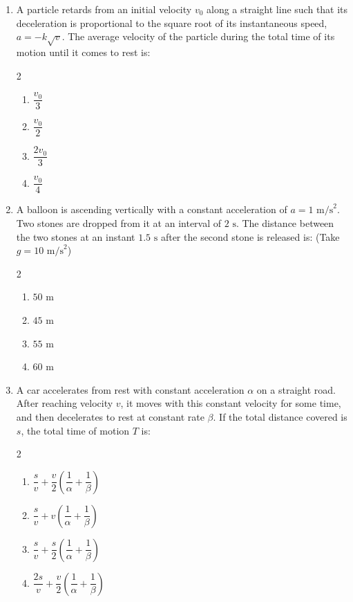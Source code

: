 \documentclass[11pt,a4paper]{article}
\begin{document}
\begin{enumerate}[label=\textbf{\textcolor{l3Crimson}{Q\arabic*.}},leftmargin=24pt,itemsep=10pt,start=51]
  \item A particle retards from an initial velocity $v_0$ along a straight line such that its deceleration is proportional to the square root of its instantaneous speed, $a = -k \sqrt{v}$. The average velocity of the particle during the total time of its motion until it comes to rest is:
  \begin{multicols}{2}
  \begin{enumerate}[label=\textbf{\textcolor{primaryDark}{(\Alph*)}},itemsep=2pt]
    \item $\dfrac{v_0}{3}$
    \item $\dfrac{v_0}{2}$
    \item $\dfrac{2v_0}{3}$
    \item $\dfrac{v_0}{4}$
  \end{enumerate}
  \end{multicols}

  \item A balloon is ascending vertically with a constant acceleration of $a = 1\text{ m/s}^2$. Two stones are dropped from it at an interval of $2\text{ s}$. The distance between the two stones at an instant $1.5\text{ s}$ after the second stone is released is: (Take $g = 10\text{ m/s}^2$)
  \begin{multicols}{2}
  \begin{enumerate}[label=\textbf{\textcolor{primaryDark}{(\Alph*)}},itemsep=2pt]
    \item $50\text{ m}$
    \item $45\text{ m}$
    \item $55\text{ m}$
    \item $60\text{ m}$
  \end{enumerate}
  \end{multicols}

  \item A car accelerates from rest with constant acceleration $\alpha$ on a straight road. After reaching velocity $v$, it moves with this constant velocity for some time, and then decelerates to rest at constant rate $\beta$. If the total distance covered is $s$, the total time of motion $T$ is:
  \begin{multicols}{2}
  \begin{enumerate}[label=\textbf{\textcolor{primaryDark}{(\Alph*)}},itemsep=2pt]
    \item $\dfrac{s}{v} + \dfrac{v}{2}\left(\dfrac{1}{\alpha} + \dfrac{1}{\beta}\right)$
    \item $\dfrac{s}{v} + v\left(\dfrac{1}{\alpha} + \dfrac{1}{\beta}\right)$
    \item $\dfrac{s}{v} + \dfrac{s}{2}\left(\dfrac{1}{\alpha} + \dfrac{1}{\beta}\right)$
    \item $\dfrac{2s}{v} + \dfrac{v}{2}\left(\dfrac{1}{\alpha} + \dfrac{1}{\beta}\right)$
  \end{enumerate}
  \end{multicols}


\end{enumerate}
\end{document}
